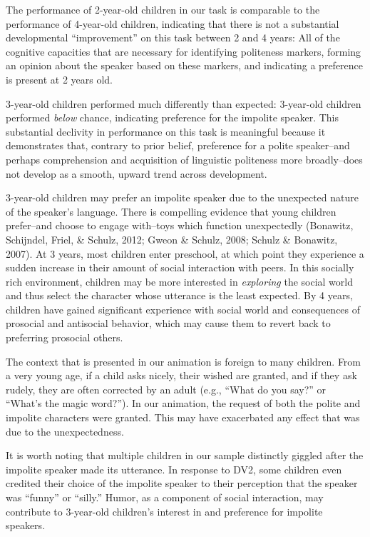 \documentclass[
  english,
  man,floatsintext]{apa6}
\begin{document}
The performance of 2-year-old children in our task is comparable to the performance of 4-year-old children, indicating that there is not a substantial developmental ``improvement'' on this task between 2 and 4 years: All of the cognitive capacities that are necessary for identifying politeness markers, forming an opinion about the speaker based on these markers, and indicating a preference is present at 2 years old.

3-year-old children performed much differently than expected: 3-year-old children performed \emph{below} chance, indicating preference for the impolite speaker. This substantial declivity in performance on this task is meaningful because it demonstrates that, contrary to prior belief, preference for a polite speaker--and perhaps comprehension and acquisition of linguistic politeness more broadly--does not develop as a smooth, upward trend across development.

3-year-old children may prefer an impolite speaker due to the unexpected nature of the speaker's language. There is compelling evidence that young children prefer--and choose to engage with--toys which function unexpectedly (Bonawitz, Schijndel, Friel, \& Schulz, 2012; Gweon \& Schulz, 2008; Schulz \& Bonawitz, 2007). At 3 years, most children enter preschool, at which point they experience a sudden increase in their amount of social interaction with peers. In this socially rich environment, children may be more interested in \emph{exploring} the social world and thus select the character whose utterance is the least expected. By 4 years, children have gained significant experience with social world and consequences of prosocial and antisocial behavior, which may cause them to revert back to preferring prosocial others.

The context that is presented in our animation is foreign to many children. From a very young age, if a child asks nicely, their wished are granted, and if they ask rudely, they are often corrected by an adult (e.g., ``What do you say?'' or ``What's the magic word?''). In our animation, the request of both the polite and impolite characters were granted. This may have exacerbated any effect that was due to the unexpectedness.

It is worth noting that multiple children in our sample distinctly giggled after the impolite speaker made its utterance. In response to DV2, some children even credited their choice of the impolite speaker to their perception that the speaker was ``funny'' or ``silly.'' Humor, as a component of social interaction, may contribute to 3-year-old children's interest in and preference for impolite speakers.
\end{document}
